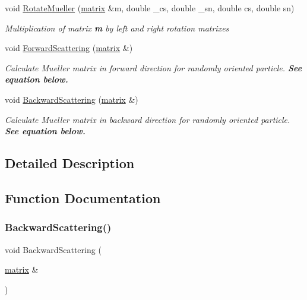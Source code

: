 \begin{DoxyCompactItemize}
void \mbox{\hyperlink{group___ax_func_ga3036e67532f4d1f5001eb52ee8ad16bc}{Rotate\+Mueller}} (\mbox{\hyperlink{classmatrix}{matrix}} \&m, double \+\_\+cs, double \+\_\+sn, double cs, double sn)
\begin{DoxyCompactList}\small\item\em Multiplication of matrix {\bfseries m} by left and right {\itshape  rotation matrixes } \end{DoxyCompactList}\item 
void \mbox{\hyperlink{group___ax_func_ga478ee7f889ff4d188e97822c4f495c41}{Forward\+Scattering}} (\mbox{\hyperlink{classmatrix}{matrix}} \&)
\begin{DoxyCompactList}\small\item\em Calculate Mueller matrix in forward direction for randomly oriented particle. {\bfseries See equation below.} \end{DoxyCompactList}\item 
void \mbox{\hyperlink{group___ax_func_ga12dbb77047b95585ed5246bc3a84a71c}{Backward\+Scattering}} (\mbox{\hyperlink{classmatrix}{matrix}} \&)
\begin{DoxyCompactList}\small\item\em Calculate Mueller matrix in backward direction for randomly oriented particle. {\bfseries See equation below. } \end{DoxyCompactList}\end{DoxyCompactItemize}


\subsection{Detailed Description}


\subsection{Function Documentation}
\mbox{\label{group___ax_func_ga12dbb77047b95585ed5246bc3a84a71c}} 
\subsubsection{\texorpdfstring{Backward\+Scattering()}{BackwardScattering()}}
{\footnotesize\ttfamily void Backward\+Scattering (\begin{DoxyParamCaption}\item[{\mbox{\hyperlink{classmatrix}{matrix}} \&}]{ }\end{DoxyParamCaption})}



